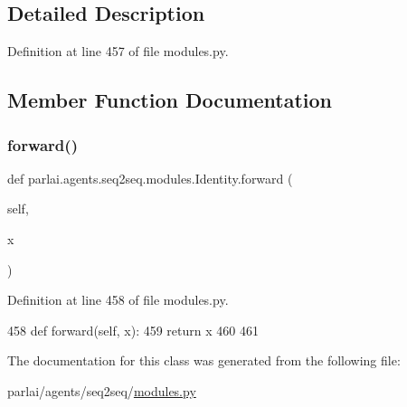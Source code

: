 \subsection{Detailed Description}


Definition at line 457 of file modules.\+py.



\subsection{Member Function Documentation}
\mbox{\label{classparlai_1_1agents_1_1seq2seq_1_1modules_1_1Identity_ab606c0becf72eba3f6453fd5a551aef3}} 
\subsubsection{\texorpdfstring{forward()}{forward()}}
{\footnotesize\ttfamily def parlai.\+agents.\+seq2seq.\+modules.\+Identity.\+forward (\begin{DoxyParamCaption}\item[{}]{self,  }\item[{}]{x }\end{DoxyParamCaption})}



Definition at line 458 of file modules.\+py.


\begin{DoxyCode}
458     \textcolor{keyword}{def }forward(self, x):
459         \textcolor{keywordflow}{return} x
460 
461 
\end{DoxyCode}


The documentation for this class was generated from the following file\+:\begin{DoxyCompactItemize}
\item 
parlai/agents/seq2seq/\hyperlink{parlai_2agents_2seq2seq_2modules_8py}{modules.\+py}\end{DoxyCompactItemize}
